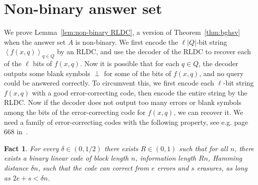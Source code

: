 \documentclass[11pt,english]{article}
\newtheorem{fact}[theorem]{Fact}
\theoremstyle{definition}
\theoremstyle{remark}
\begin{document}
\section{Non-binary answer set\label{sec:Non-binary-alphabets}}
We prove Lemma~\ref{lem:non-binary RLDC}, a version of Theorem~\ref{thm:bghsv}
when the answer set $A$ is non-binary. We first encode the $\ell|Q|$-bit
string $\left\langle f(x,q)\right\rangle_{q\in Q}$ by an RLDC, and
use the decoder of the RLDC to recover each of the $\ell$ bits of
$f(x,q)$. Now it is possible that for each $q\in Q$, the decoder
outputs some blank symbols $\perp$ for some of the bits of $f(x,q)$,
and no query could be answered correctly. To circumvent this, we first
encode each $\ell$-bit string $f(x,q)$ with a good error-correcting
code, then encode the entire string by the RLDC. Now if the decoder
does not output too many errors or blank symbols among the bits of
the error-correcting code for $f(x,q)$, we can recover it. We need
a family of error-correcting codes with the following property, see
e.g. page $668$ in~\cite{huffman-coding}.

\begin{fact}\label{fact:good code} For every $\delta\in(0,1/2)$
there exists $R\in(0,1)$ such that for all $n$, there exists a binary
linear code of block length $n$, information length $Rn$, Hamming
distance $\delta n$, such that the code can correct from $e$ errors
and $s$ erasures, as long as $2e+s<\delta n$. \end{fact}
\end{document}
